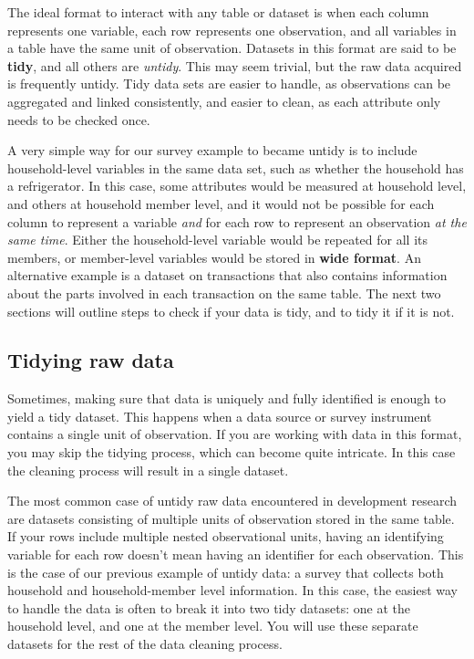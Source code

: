 The ideal format to interact with any table or dataset is when
each column represents one variable,
each row represents one observation, 
and all variables in a table have the same unit of observation.
Datasets in this format are said to be \textbf{tidy},
and all others are \textit{untidy}.
This may seem trivial, but the raw data acquired is frequently untidy.
Tidy data sets are easier to handle,
as observations can be aggregated and linked consistently,
and easier to clean, as each attribute only needs to be checked once.

A very simple way for our survey example to became untidy is to include
household-level variables in the same data set,
such as whether the household has a refrigerator.
In this case, some attributes would be measured at
household level, and others at household member level,
and it would not be possible for each column to represent a variable
\textit{and} for each row to represent an observation \textit{at the same time}.
Either the household-level variable would be repeated for all its members,
or member-level variables would be stored in 
\textbf{wide format}.
An alternative example is a dataset on transactions that also contains information
about the parts involved in each transaction on the same table.
The next two sections will outline steps to check if your data is tidy,
and to tidy it if it is not.

\subsection{Tidying raw data}

Sometimes, making sure that data is uniquely and fully identified 
is enough to yield a tidy dataset.
This happens when a data source or survey instrument
contains a single unit of observation.
If you are working with data in this format,
you may skip the tidying process,
which can become quite intricate.
In this case the cleaning process will result in a single dataset.

The most common case of untidy raw data encountered in development research
are datasets consisting of multiple units of observation stored in the same table. 
If your rows include multiple nested observational units,
having an identifying variable for each row doesn't mean having an identifier for each observation.
This is the case of our previous example of untidy data:
a survey that collects both household and household-member level information.
In this case, 
the easiest way to handle the data is often to break it into two tidy datasets:
one at the household level, and one at the member level.
You will use these separate datasets for the rest of the data cleaning process.

